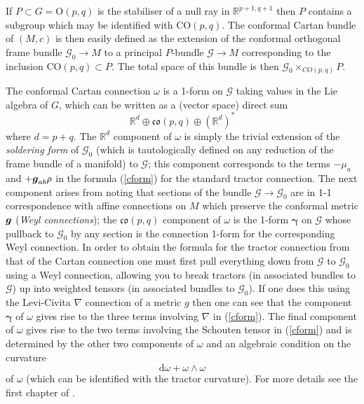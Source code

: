 \documentclass[a4paper,12pt]{amsart}
\def\bg{\mbox{\boldmath $g$}}
\theoremstyle{remark}
\newcommand{\nn}[1]{(\ref{#1})}
\begin{document}
If $P\subset G=\mathrm{O}(p,q)$ is the stabiliser of a null ray in $\mathbb{R}^{p+1,q+1}$ then $P$ contains a subgroup which may be identified with $\mathrm{CO}(p,q)$. The conformal Cartan bundle of $(M,c)$ is then easily defined as the extension of the conformal orthogonal frame bundle $\mathcal{G}_0\rightarrow M$ to a principal $P$-bundle $\mathcal{G}\rightarrow M$ corresponding to the inclusion $\mathrm{CO}(p,q)\subset P$. The total space of this bundle is then $\mathcal{G}_0\times_{CO(p,q)}P$. 

The conformal Cartan connection $\omega$ is a 1-form on $\mathcal{G}$ taking values in the Lie algebra of $G$, which can be written as a (vector space) direct sum
$$
\mathbb{R}^d \oplus \mathfrak{co}(p,q) \oplus \left( \mathbb{R}^d\right)^*
$$ 
where $d=p+q$. The $\mathbb{R}^d$ component of $\omega$ is simply the trivial extension of the \emph{soldering form} of $\mathcal{G}_0$ (which is tautologically defined on any reduction of the frame bundle of a manifold) to $\mathcal{G}$; this component corresponds to the terms $-\mu_a$ and $+\bg_{ab}\rho$ in the formula \nn{cform} for the standard tractor connection. The next component arises from noting that sections of the bundle $\mathcal{G}\rightarrow \mathcal{G}_0$ are in 1-1 correspondence with affine connections on $M$ which preserve the conformal metric $\bg$ (\emph{Weyl connections}); the $\mathfrak{co}(p,q)$ component of $\omega$ is the 1-form $\boldsymbol{\gamma}$ on $\mathcal{G}$ whose pullback to $\mathcal{G}_0$ by any section is the connection 1-form for the corresponding Weyl connection. In order to obtain the formula for the tractor connection from that of the Cartan connection one must first pull everything down from $\mathcal{G}$ to $\mathcal{G}_0$ using a Weyl connection, allowing you to break tractors (in associated bundles to $\mathcal{G}$) up into weighted tensors (in associated bundles to $\mathcal{G}_0$). If one does this using the Levi-Civita $\nabla$ connection of a metric $g$ then one can see that the component $\boldsymbol{\gamma}$ of $\omega$ gives rise to the three terms involving $\nabla$ in \nn{cform}. The final component of $\omega$ gives rise to the two terms involving the Schouten tensor in \nn{cform} and is determined by the other two components of $\omega$ and an algebraic condition on the curvature 
$$
\mathrm{d}\omega + \omega \wedge \omega
$$ 
of $\omega$ (which can be identified with the tractor curvature). For more details see the first chapter of \cite{CSbook}.
\end{document}

